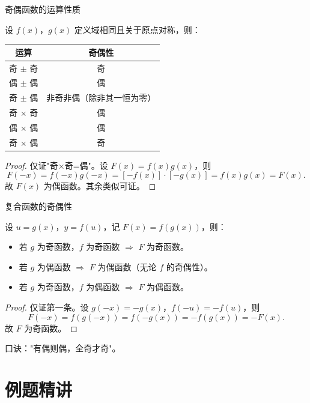 \begin{frame}[allowframebreaks]{奇偶函数的运算性质}
	\begin{theorem}[四则运算的奇偶性]
		设 $f(x)$，$g(x)$ 定义域相同且关于原点对称，则：
		\begin{center}
			\begin{tabular}{c|c}
				\toprule
				运算 & 奇偶性 \\
				\midrule
				奇 $\pm$ 奇 & 奇 \\
				偶 $\pm$ 偶 & 偶 \\
				奇 $\pm$ 偶 & 非奇非偶（除非其一恒为零）\\
				奇 $\times$ 奇 & 偶 \\
				偶 $\times$ 偶 & 偶 \\
				奇 $\times$ 偶 & 奇 \\
				\bottomrule
			\end{tabular}
		\end{center}
	\end{theorem}
	\begin{proof}
		仅证"奇×奇=偶"。设 $F(x)=f(x)g(x)$，则
		\[
		F(-x)=f(-x)g(-x)=[-f(x)]\cdot[-g(x)]=f(x)g(x)=F(x).
		\]
		故 $F(x)$ 为偶函数。其余类似可证。
	\end{proof}
\end{frame}

\begin{frame}[allowframebreaks]{复合函数的奇偶性}
	\begin{theorem}[复合函数的奇偶性]
		设 $u=g(x)$，$y=f(u)$，记 $F(x)=f(g(x))$，则：
		\begin{itemize}
			\item 若 $g$ 为奇函数，$f$ 为奇函数 $\Rightarrow$ $F$ 为奇函数。
			\item 若 $g$ 为偶函数 $\Rightarrow$ $F$ 为偶函数（无论 $f$ 的奇偶性）。
			\item 若 $g$ 为奇函数，$f$ 为偶函数 $\Rightarrow$ $F$ 为偶函数。
		\end{itemize}
	\end{theorem}
	\begin{proof}
		仅证第一条。设 $g(-x)=-g(x)$，$f(-u)=-f(u)$，则
		\[
		F(-x)=f(g(-x))=f(-g(x))=-f(g(x))=-F(x).
		\]
		故 $F$ 为奇函数。
	\end{proof}
	\begin{remark}
		口诀："有偶则偶，全奇才奇"。
	\end{remark}
\end{frame}

\section{例题精讲}

